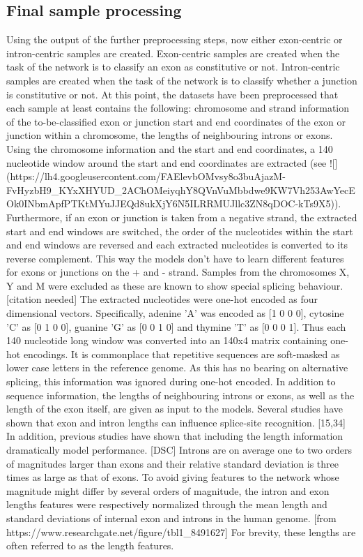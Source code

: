 \subsection{Final sample processing} \cite{subsec:finalsampleprocessing}

Using the output of the further preprocessing steps, now either exon-centric or intron-centric samples are created. Exon-centric samples are created when the task of the network is to classify an exon as constitutive or not. Intron-centric samples are created when the task of the network is to classify whether a junction is constitutive or not.
At this point, the datasets have been preprocessed that each sample at least contains the following:
chromosome and strand information of the to-be-classified exon or junction
start and end coordinates of the exon or junction within a chromosome,
the lengths of neighbouring introns or exons.
Using the chromosome information and the start and end coordinates, a 140 nucleotide window around the start and end coordinates are extracted (see ![](https://lh4.googleusercontent.com/FAElevbOMvsy8o3buAjazM-FvHyzbH9_KYxXHYUD_2AChOMeiyqhY8QVnVuMbbdwe9KW7Vh253AwYecEOk0INbmApfPTKtMYuJJEQd8ukXjY6N5ILRRMUJllc3ZN8qDOC-kTs9X5)). Furthermore, if an exon or junction is taken from a negative strand, the extracted start and end windows are switched, the order of the nucleotides within the start and end windows are reversed and each extracted nucleotides is converted to its reverse complement. This way the models don't have to learn different features for exons or junctions on the + and - strand.
Samples from the chromosomes X, Y and M were excluded as these are known to show special splicing behaviour. [citation needed]
The extracted nucleotides were one-hot encoded as four dimensional vectors. Specifically, adenine 'A' was encoded as [1 0 0 0], cytosine 'C' as [0 1 0 0], guanine 'G' as [0 0 1 0] and thymine 'T' as [0 0 0 1]. Thus each 140 nucleotide long window was converted into an 140x4 matrix containing one-hot encodings.
It is commonplace that repetitive sequences are soft-masked as lower case letters in the reference genome. As this has no bearing on alternative splicing, this information was ignored during one-hot encoded.
In addition to sequence information, the lengths of neighbouring introns or exons, as well as the length of the exon itself, are given as input to the models. Several studies have shown that exon and intron lengths can influence splice-site recognition. [15,34] In addition, previous studies have shown that including the length information dramatically model performance. [DSC] Introns are on average one to two orders of magnitudes larger than exons and their relative standard deviation is three times as large as that of exons. To avoid giving features to the network whose magnitude might differ by several orders of magnitude, the intron and exon lengths features were respectively normalized through the mean length and standard deviations of internal exon and introns in the human genome. [from https://www.researchgate.net/figure/tbl1_8491627] For brevity, these lengths are often referred to as the length features.
